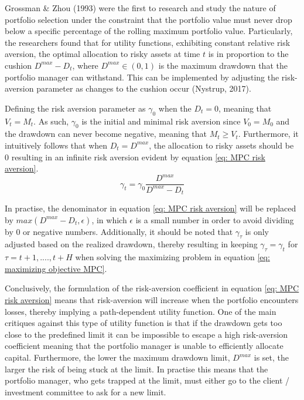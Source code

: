 Grossman \& Zhou (1993) were the first to research and study the nature of portfolio selection under the constraint that the portfolio value must never drop below a specific percentage of the rolling maximum portfolio value. Particularly, the researchers found that for utility functions, exhibiting constant relative risk aversion, the optimal allocation to risky assets at time $t$ is in proportion to the cushion $D^{max}-D_t$, where $D^{max} \in (0,1)$ is the maximum drawdown that the portfolio manager can withstand. This can be implemented by adjusting the risk-aversion parameter as changes to the cushion occur (Nystrup, 2017).

Defining the risk aversion parameter as $\gamma_0$ when the $D_t = 0$, meaning that $V_t = M_t$. As such, $\gamma_0$ is the initial and minimal risk aversion since $V_0 = M_0$ and the drawdown can never become negative, meaning that $M_t \geq V_t$. Furthermore, it intuitively follows that when $D_t = D^{max}$, the allocation to risky assets should be 0 resulting in an infinite risk aversion evident by equation \ref{eq: MPC risk aversion}.
\begin{equation}
\gamma_t = \gamma_0 \frac{D^{max}}{D^{max}-D_t}
    \label{eq: MPC risk aversion}
\end{equation}

In practise, the denominator in equation \ref{eq: MPC risk aversion} will be replaced by $max(D^{max}-D_t,\epsilon)$, in which $\epsilon$ is a small number in order to avoid dividing by 0 or negative numbers. Additionally, it should be noted that $\gamma_\tau$ is only adjusted based on the realized drawdown, thereby resulting in keeping $\gamma_\tau = \gamma_t$ for $\tau = t+1,...., t+H$ when solving the maximizing problem in equation \ref{eq: maximizing objective MPC}.

Conclusively, the formulation of the risk-aversion coefficient in equation \ref{eq: MPC risk aversion} means that risk-aversion will increase when the portfolio encounters losses, thereby implying a path-dependent utility function. One of the main critiques against this type of utility function is that if the drawdown gets too close to the predefined limit it can be impossible to escape a high risk-aversion coefficient meaning that the portfolio manager is unable to efficiently allocate capital. Furthermore, the lower the maximum drawdown limit, $D^{max}$ is set, the larger the risk of being stuck at the limit. In practise this means that the portfolio manager, who gets trapped at the limit, must either go to the client / investment committee to ask for a new limit.

